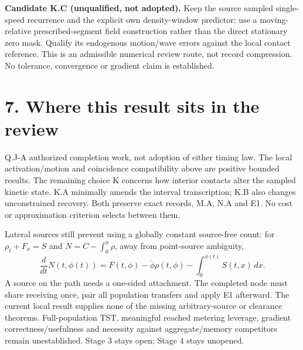 \documentclass[11pt,a4paper]{article}
\begin{document}
\textbf{Candidate K.C (unqualified, not adopted).} Keep the source sampled
single-speed recurrence and the explicit own density-window predictor; use a
moving-relative prescribed-segment field construction rather than the direct
stationary zero mask. Qualify its endogenous motion/wave errors against the
local contact reference. This is an admissible numerical review route, not
record compression. No tolerance, convergence or gradient claim is established.

\section*{7. Where this result sits in the review}
Q.J-A authorized completion work, not adoption of either timing law. The
local activation/motion and coincidence compatibility above are positive
bounded results. The remaining choice K concerns how interior contacts alter
the sampled kinetic state. K.A minimally amends the interval transcription;
K.B also changes unconstrained recovery. Both preserve exact records, M.A,
N.A and E1. No cost or approximation criterion selects between them.

Lateral sources still prevent using a globally constant source-free count:
for $\rho_t+F_x=S$ and $N=C-\int_0^x\rho$, away from point-source ambiguity,
\begin{equation}
 \frac{d}{dt}N(t,\phi(t))
 =F(t,\phi)-\dot\phi\rho(t,\phi)-\int_0^{\phi(t)}S(t,x)\,dx.
\end{equation}
A source on the path needs a one-sided attachment. The completed node must
share receiving once, pair all population transfers and apply E1 afterward.
The current local result supplies none of the missing arbitrary-source or
clearance theorems. Full-population TST, meaningful reached metering leverage,
gradient correctness/usefulness and necessity against aggregate/memory
competitors remain unestablished. Stage 3 stays open; Stage 4 stays unopened.
\end{document}
